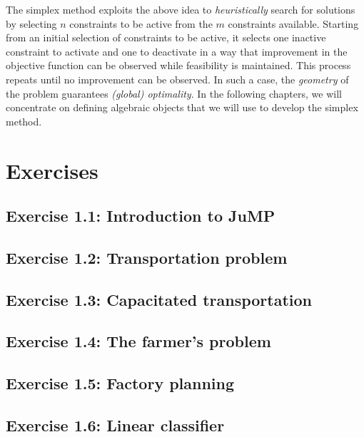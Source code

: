 The simplex method exploits the above idea to \emph{heuristically} search for solutions by selecting $n$ constraints to be active from the $m$ constraints available. Starting from an initial selection of constraints to be active, it selects one inactive constraint to activate and one to deactivate in a way that improvement in the objective function can be observed while feasibility is maintained. This process repeats until no improvement can be observed. In such a case, the \emph{geometry} of the problem guarantees \emph{(global) optimality}. In the following chapters, we will concentrate on defining algebraic objects that we will use to develop the simplex method.


\vfill
\pagebreak

\section{Exercises}

\subsection*{Exercise 1.1: Introduction to JuMP}


\subsection*{Exercise 1.2: Transportation problem \cite{kwon2019julia}}


\subsection*{Exercise 1.3: Capacitated transportation}


\subsection*{Exercise 1.4: The farmer's problem \cite{birge2011introduction}}


\subsection*{Exercise 1.5: Factory planning \cite{williams2013model}}


\subsection*{Exercise 1.6: Linear classifier}




